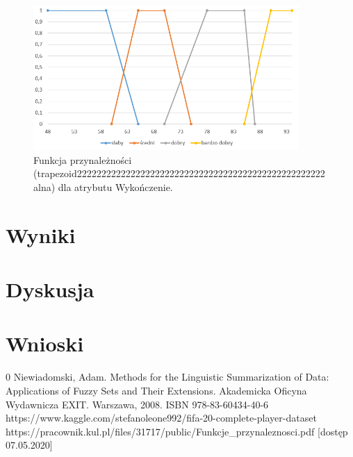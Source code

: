\documentclass{classrep}
\begin{document}
	\begin{figure}[h!]
		\centering
		\includegraphics[width=0.9\textwidth]{zmienne/4.png}
		\caption{Funkcja przynależności (trapezoid222222222222222222222222222222222222222222222222222alna) dla atrybutu Wykończenie.}
		\label{wykresOverall}
	\end{figure}
	
	\section{Wyniki} %
	
	\section{Dyskusja} %
	
	\section{Wnioski}
		
	
	\begin{thebibliography} {0}
		 Niewiadomski, Adam. Methods for the Linguistic Summarization of Data: Applications of Fuzzy Sets and Their Extensions. Akademicka Oficyna Wydawnicza EXIT. Warszawa, 2008. ISBN 978-83-60434-40-6
		 https://www.kaggle.com/stefanoleone992/fifa-20-complete-player-dataset 
		 https://pracownik.kul.pl/files/31717/public/Funkcje\_przynaleznosci.pdf [dostęp 07.05.2020]
		
	\end{thebibliography}
\end{document}
